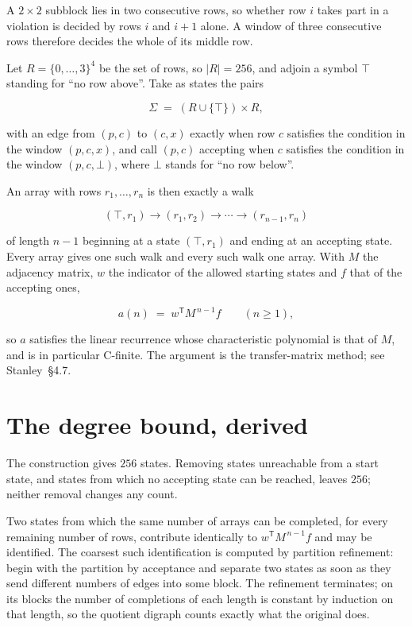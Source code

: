\documentclass[11pt]{article}
\theoremstyle{definition}
\begin{document}
A $2\times2$ subblock lies in two consecutive rows, so whether row $i$ takes part in a violation is decided by rows $i$ and $i+1$ alone. A window of three consecutive rows therefore decides the whole of its middle row.

Let $R = \{0,\dots,3\}^{4}$ be the set of rows, so $|R| = 256$, and adjoin a symbol $\top$ standing for ``no row above''. Take as states the pairs

\[\Sigma \;=\; (R \cup \{\top\}) \times R,\]

with an edge from $(p,c)$ to $(c,x)$ exactly when row $c$ satisfies the condition in the window $(p,c,x)$, and call $(p,c)$ accepting when $c$ satisfies the condition in the window $(p,c,\bot)$, where $\bot$ stands for ``no row below''.

An array with rows $r_1,\dots,r_n$ is then exactly a walk

\[(\top,r_1) \to (r_1,r_2) \to \cdots \to (r_{n-1},r_n)\]

of length $n-1$ beginning at a state $(\top,r_1)$ and ending at an accepting state. Every array gives one such walk and every such walk one array. With $M$ the adjacency matrix, $w$ the indicator of the allowed starting states and $f$ that of the accepting ones,

\[a(n) \;=\; w^{\mathsf T} M^{\,n-1} f \qquad (n \ge 1),\]

so $a$ satisfies the linear recurrence whose characteristic polynomial is that of $M$, and is in particular C-finite. The argument is the transfer-matrix method; see Stanley~\S4.7.

\section{The degree bound, derived}

The construction gives $256$ states. Removing states unreachable from a start state, and states from which no accepting state can be reached, leaves $256$; neither removal changes any count.

Two states from which the same number of arrays can be completed, for every remaining number of rows, contribute identically to $w^{\mathsf T}M^{\,n-1}f$ and may be identified. The coarsest such identification is computed by partition refinement: begin with the partition by acceptance and separate two states as soon as they send different numbers of edges into some block. The refinement terminates; on its blocks the number of completions of each length is constant by induction on that length, so the quotient digraph counts exactly what the original does.
\end{document}
